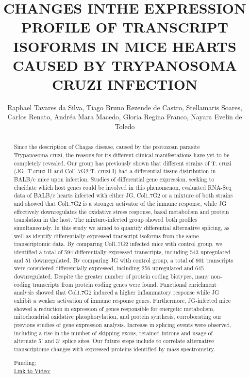 \documentclass[twoside]{article}
\title{\vspace{-15mm}\fontsize{24pt}{10pt}\selectfont\textbf{ CHANGES INTHE EXPRESSION PROFILE OF TRANSCRIPT ISOFORMS IN MICE HEARTS CAUSED BY TRYPANOSOMA CRUZI INFECTION }} %
\author{ Raphael Tavares da Silva,  Tiago Bruno Rezende de Castro,  Stellamaris Soares,  Carlos Renato,  Andr\'ea Mara Macedo,  Gloria Regina Franco,  Nayara Evelin de Toledo }
\affil{ UNIVERSIDADE FEDERAL DE MINAS GERAIS,  UFMG - Departamento de Bioqu\'{\i}mica e Imunologia,  UNIVERSIDADE FEDERAL DE MINAS GERAIS }
\date{}
\begin{document}
  
  
  \maketitle %
  
  
  \thispagestyle{fancy} %
  
  
  \begin{abstract}
  Since the description of Chagas disease,  caused by the protozoan parasite Trypanosoma cruzi,  the reasons for its different clinical manifestations have yet to be completely revealed. Our group has previously shown that different strains of T. cruzi (JG- T.cruzi II and Col1.7G2-T. cruzi I) had a differential tissue distribution in BALB/c mice upon infection. Studies of differential gene expression,  seeking to elucidate which host genes could be involved in this phenomenon,  evaluated RNA-Seq data of BALB/c hearts infected with either JG,  Col1.7G2 or a mixture of both strains and showed that Col1.7G2 is a stronger activator of the immune response,  while JG effectively downregulates the oxidative stress response,  basal metabolism and protein translation in the host. The mixture-infected group showed both profiles simultaneously. In this study we aimed to quantify differential alternative splicing,  as well as identify differentially expressed transcript isoforms from the same transcriptomic data. By comparing Col1.7G2 infected mice with control group,  we identified a total of 594 differentially expressed transcripts,  including 543 upregulated and 51 downregulated. By comparing JG with control group,  a total of 901 transcripts were considered differentially expressed,  including 256 upregulated and 645 downregulated. Despite the greater number of protein coding biotypes,  many non-coding transcripts from protein coding genes were found.  Functional enrichment analysis showed that Col1.7G2 induced a higher inflammatory response while JG exhibit a weaker activation of immune response genes. Furthermore,  JG-infected mice showed a reduction in expression of genes responsible for energetic metabolism,  mitochondrial oxidative phosphorylation,  and protein synthesis,  corroborating our previous studies of gene expression analysis. Increase in splicing events were observed,  including a rise in the number of skipping exons,  retained introns and usage of alternate 5’ and 3’ splice sites. Our future steps include to correlate alternative transcriptome changes with expressed proteins identified by mass spectrometry.
  
  Funding:   \\
  \href{http://ab3c.org.br/xpress_pres2020/xmxp2020-304948.html}{Link to Video:}

  \end{abstract}
   
  
\end{document}
